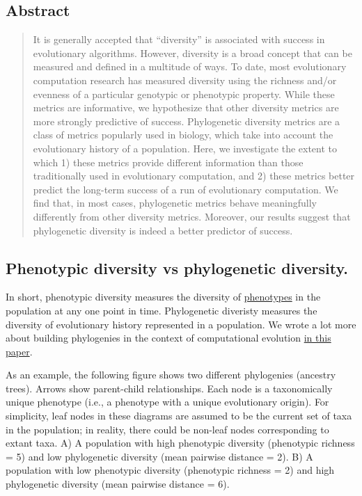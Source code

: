 \documentclass[]{book}
\begin{document}
\hypertarget{abstract}{%
\subsection{Abstract}\label{abstract}}

\begin{quote}
It is generally accepted that ``diversity'' is associated with success in evolutionary algorithms. However, diversity is a broad concept that can be measured and defined in a multitude of ways. To date, most evolutionary computation research has measured diversity using the richness and/or evenness of a particular genotypic or phenotypic property. While these metrics are informative, we hypothesize that other diversity metrics are more strongly predictive of success. Phylogenetic diversity metrics are a class of metrics popularly used in biology, which take into account the evolutionary history of a population. Here, we investigate the extent to which 1) these metrics provide different information than those traditionally used in evolutionary computation, and 2) these metrics better predict the long-term success of a run of evolutionary computation. We find that, in most cases, phylogenetic metrics behave meaningfully differently from other diversity metrics. Moreover, our results suggest that phylogenetic diversity is indeed a better predictor of success.
\end{quote}

\hypertarget{phenotypic-diversity-vs-phylogenetic-diversity.}{%
\subsection{Phenotypic diversity vs phylogenetic diversity.}\label{phenotypic-diversity-vs-phylogenetic-diversity.}}

In short, phenotypic diversity measures the diversity of \href{https://stackoverflow.com/questions/30002900/definitions-of-phenotype-and-genotype/30005949\#30005949}{phenotypes} in the population at any one point in time. Phylogenetic diveristy measures the diversity of evolutionary history represented in a population. We wrote a lot more about building phylogenies in the context of computational evolution \href{https://github.com/emilydolson/interpreting_the_tape_of_life\#metricvisualization-implementations}{in this paper}.

As an example, the following figure shows two different phylogenies (ancestry trees). Arrows show parent-child relationships. Each node is a taxonomically unique phenotype (i.e., a phenotype with a unique evolutionary origin). For simplicity, leaf nodes in these diagrams are assumed to be the current set of taxa in the population; in reality, there could be non-leaf nodes corresponding to extant taxa. A) A population with high phenotypic diversity (phenotypic richness = 5) and low phylogenetic diversity (mean pairwise distance = 2). B) A population with low phenotypic diversity (phenotypic richness = 2) and high phylogenetic diversity (mean pairwise distance = 6).
\end{document}
